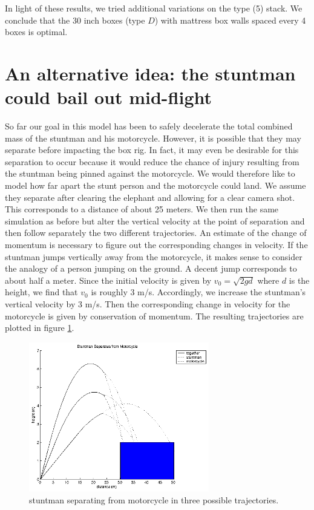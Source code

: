 \documentclass[12pt,a4paper,titlepage]{article}
\begin{document}
In light of these results, we tried additional variations on the type (5) stack.  We conclude that
the 30 inch boxes (type $D$) with mattress box walls spaced every 4 boxes is optimal.


\section{An alternative idea: the stuntman could bail out mid-flight}
So far our goal in this model has been to safely decelerate the total combined mass of the stuntman and his
motorcycle.  However, it is possible that they may separate before impacting the box rig.  In fact, it may even be desirable
for this separation to occur because it would reduce the chance of injury resulting from the
stuntman being pinned against the motorcycle.  We would therefore like to model how far apart the stunt person and the
motorcycle could land.  We assume they separate after clearing the elephant and allowing for a clear camera shot.  This
corresponds to a distance of about 25 meters.  We then run the same simulation as before but alter the vertical velocity
at the point of separation and then follow separately the two different trajectories.  An estimate of the change of momentum is
necessary to figure out the corresponding changes in velocity.  If the stuntman jumps vertically away from the motorcycle, it
makes sense to consider the analogy of a person jumping on the ground.  A decent jump corresponds to about half a meter.  Since
the initial velocity is given by $v_{0} = \sqrt{2gd}$ where $d$ is the height, we find that $v_{0}$ is roughly 3 m/s.  Accordingly,
we increase the stuntman's vertical velocity by 3 m/s.  Then the corresponding change in velocity for the motorcycle is given
by conservation of momentum.  The resulting trajectories are plotted in figure \ref{separation}.

\begin{figure}
\caption{\label{separation}stuntman separating from motorcycle in three possible trajectories.}
\begin{center}
\includegraphics[width=0.7\textwidth]{separation.eps}
\end{center}
\end{figure}
\end{document}
